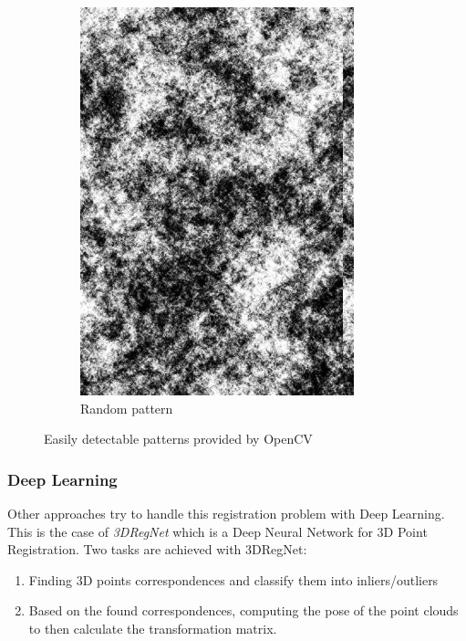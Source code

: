 \begin{figure}[H]
\begin{subfigure}[b]{0.24\textwidth}
    \includegraphics[width=\textwidth]{images/registration/random_pattern.jpg}
    \caption{Random pattern}
    \label{figure:random_pattern}
  \end{subfigure}
  \caption{Easily detectable patterns provided by OpenCV \cite{noauthor_opencv_nodate}}
  \label{figure:pattern}
\end{figure}


\subsubsection{Deep Learning}

Other approaches try to handle this registration problem with Deep Learning. This is the case of \textit{3DRegNet} \cite{pais19} which is a Deep Neural Network for 3D Point Registration. Two tasks are achieved with 3DRegNet:

\begin{enumerate}
    \item Finding 3D points correspondences and classify them into inliers/outliers
    \item Based on the found correspondences, computing the pose of the point clouds to then calculate the transformation matrix.
\end{enumerate}